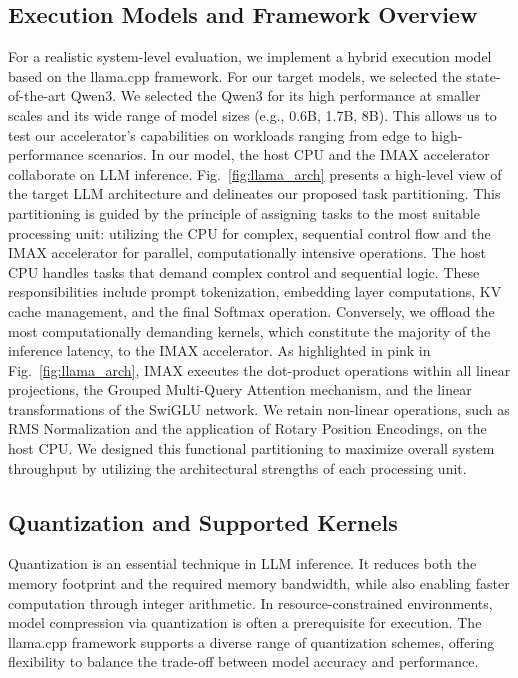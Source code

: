 \subsection{Execution Models and Framework Overview}
For a realistic system-level evaluation, we implement a hybrid execution model based on the llama.cpp framework.
For our target models, we selected the state-of-the-art Qwen3. 
We selected the Qwen3 for its high performance at smaller scales and its wide range of model sizes (e.g., 0.6B, 1.7B, 8B). 
This allows us to test our accelerator's capabilities on workloads ranging from edge to high-performance scenarios.
In our model, the host CPU and the IMAX accelerator collaborate on LLM inference.
Fig.~\ref{fig:llama_arch} presents a high-level view of the target LLM architecture and delineates our proposed task partitioning.
This partitioning is guided by the principle of assigning tasks to the most suitable processing unit: utilizing the CPU for complex, sequential control flow and the IMAX accelerator for parallel, computationally intensive operations.
The host CPU handles tasks that demand complex control and sequential logic. 
These responsibilities include prompt tokenization, embedding layer computations, KV cache management, and the final Softmax operation. 
Conversely, we offload the most computationally demanding kernels, which constitute the majority of the inference latency, to the IMAX accelerator. 
As highlighted in pink in Fig.~\ref{fig:llama_arch}, IMAX executes the dot-product operations within all linear projections, the Grouped Multi-Query Attention mechanism, and the linear transformations of the SwiGLU network. 
We retain non-linear operations, such as RMS Normalization and the application of Rotary Position Encodings, on the host CPU. 
We designed this functional partitioning to maximize overall system throughput by utilizing the architectural strengths of each processing unit.



\subsection{Quantization and Supported Kernels}
Quantization is an essential technique in LLM inference. 
It reduces both the memory footprint and the required memory bandwidth, while also enabling faster computation through integer arithmetic. 
In resource-constrained environments, model compression via quantization is often a prerequisite for execution. 
The llama.cpp framework supports a diverse range of quantization schemes, offering flexibility to balance the trade-off between model accuracy and performance.

